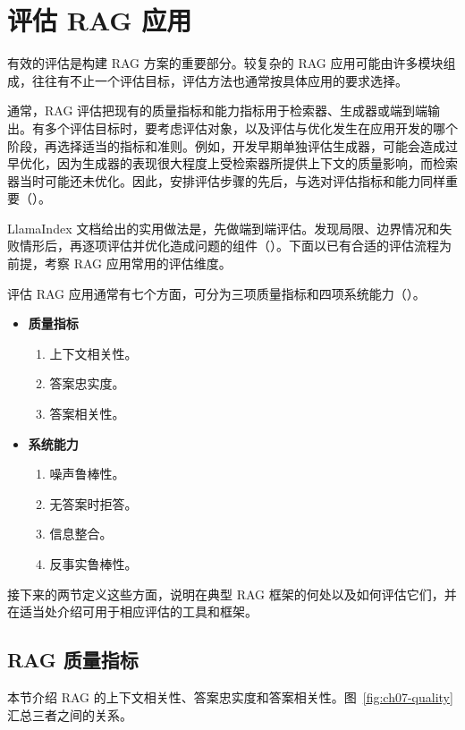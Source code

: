 \section{评估 RAG 应用}
\label{sec:ch07-evaluation}
有效的评估是构建 RAG 方案的重要部分。较复杂的 RAG 应用可能由许多模块组成，往往有不止一个评估目标，评估方法也通常按具体应用的要求选择。

通常，RAG 评估把现有的质量指标和能力指标用于检索器、生成器或端到端输出。有多个评估目标时，要考虑评估对象，以及评估与优化发生在应用开发的哪个阶段，再选择适当的指标和准则。例如，开发早期单独评估生成器，可能会造成过早优化，因为生成器的表现很大程度上受检索器所提供上下文的质量影响，而检索器当时可能还未优化。因此，安排评估步骤的先后，与选对评估指标和能力同样重要（）。

LlamaIndex 文档给出的实用做法是，先做端到端评估。发现局限、边界情况和失败情形后，再逐项评估并优化造成问题的组件（）。下面以已有合适的评估流程为前提，考察 RAG 应用常用的评估维度。

\begin{keypoint}
评估 RAG 应用通常有七个方面，可分为三项质量指标和四项系统能力（）。
\begin{itemize}
\item \textbf{质量指标}
  \begin{enumerate}
  \item 上下文相关性。
  \item 答案忠实度。
  \item 答案相关性。
  \end{enumerate}
\item \textbf{系统能力}
  \begin{enumerate}
  \item 噪声鲁棒性。
  \item 无答案时拒答。
  \item 信息整合。
  \item 反事实鲁棒性。
  \end{enumerate}
\end{itemize}
\end{keypoint}

接下来的两节定义这些方面，说明在典型 RAG 框架的何处以及如何评估它们，并在适当处介绍可用于相应评估的工具和框架。

\subsection{RAG 质量指标}
\label{sec:ch07-quality-metrics}
本节介绍 RAG 的上下文相关性、答案忠实度和答案相关性。图~\ref{fig:ch07-quality} 汇总三者之间的关系。

